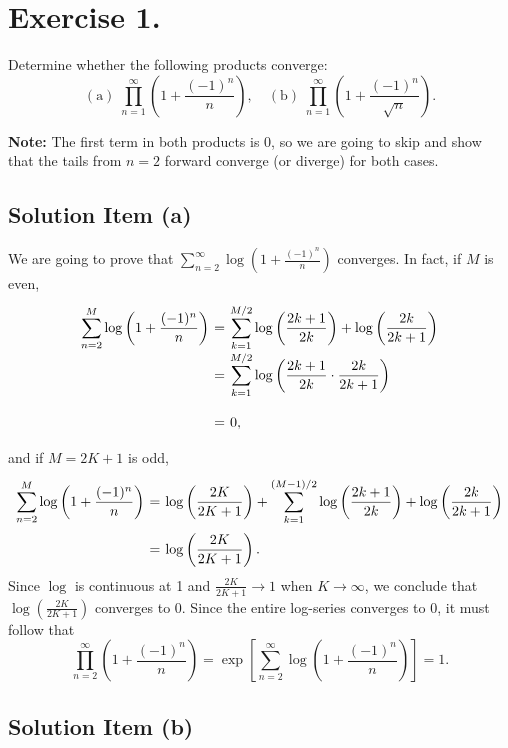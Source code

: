 
\section{Exercise 1.}

Determine whether the following products converge:
\[
(\mbox{a})\;\prod_{n=1}^{\infty} \left( 1 + \frac{(-1)^n}{n} \right), \quad (\mbox{b})\;\prod_{n=1}^{\infty} \left( 1 + \frac{(-1)^n}{\sqrt{n}} \right).
\]

\textbf{Note:} The first term in both products is 0, so we are going to skip and show that the tails from $n = 2$ forward converge (or diverge) for both cases.

\subsection*{Solution Item (a)}

We are going to prove that $\sum_{n = 2}^{\infty}\log\left( 1+\frac{(-1)^n}{n} \right)$ converges. In fact, if $M$ is even,
\[ \everymath{\displaystyle}
\arraycolsep=1.8pt\def\arraystretch{2.5}
\begin{array}{rcl}
    \sum_{n = 2}^{M}\log\left( 1+\frac{(-1)^n}{n} \right) & = & 
    \sum_{k = 1}^{M/2}\log\left( \frac{2k+1}{2k}\right) + \log\left(\frac{2k}{2k+1}\right)\\
    & = & \sum_{k = 1}^{M/2} \log\left( \frac{2k+1}{2k}\cdot\frac{2k}{2k+1}\right)\\
    & = & 0,
\end{array} \]
and if $M = 2K+1$ is odd,
\[ \everymath{\displaystyle}
\arraycolsep=1.8pt\def\arraystretch{2.5}
\begin{array}{rcl}
    \sum_{n = 2}^{M}\log\left( 1+\frac{(-1)^n}{n} \right) & = & \log\left(\frac{2K}{2K+1}\right) + 
    \sum_{k = 1}^{(M-1)/2}\log\left( \frac{2k+1}{2k}\right) + \log\left(\frac{2k}{2k+1}\right)\\
    & = & \log\left(\frac{2K}{2K+1}\right).
\end{array} \]
Since $\log$ is continuous at 1 and $\frac{2K}{2K+1} \to 1$ when $K\to \infty$, we conclude that $\log\left(\frac{2K}{2K+1}\right)$ converges to 0. Since the entire log-series converges to 0, it must follow that
\[ \prod_{n=2}^{\infty} \left( 1 + \frac{(-1)^n}{n} \right) = \exp\left[ \sum_{n = 2}^{\infty}\log\left( 1+\frac{(-1)^n}{n} \right)  \right] = 1. \]

\subsection*{Solution Item (b)}

